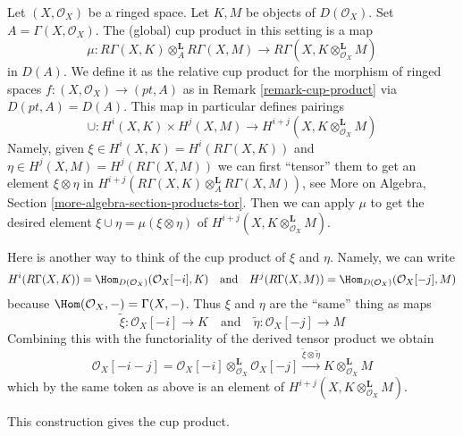 \noindent
Let $(X, \mathcal{O}_X)$ be a ringed space. Let $K, M$ be objects
of $D(\mathcal{O}_X)$. Set $A = \Gamma(X, \mathcal{O}_X)$.
The (global) cup product in this setting is a map
$$
\mu :
R\Gamma(X, K) \otimes_A^\mathbf{L} R\Gamma(X, M)
\longrightarrow
R\Gamma(X, K \otimes_{\mathcal{O}_X}^\mathbf{L} M)
$$
in $D(A)$. We define it as the relative cup product for the
morphism of ringed spaces $f : (X, \mathcal{O}_X) \to (pt, A)$
as in Remark \ref{remark-cup-product} via $D(pt, A) = D(A)$.
This map in particular defines pairings
$$
\cup :
H^i(X, K) \times H^j(X, M)
\longrightarrow
H^{i + j}(X, K \otimes_{\mathcal{O}_X}^\mathbf{L} M)
$$
Namely, given $\xi \in H^i(X, K) = H^i(R\Gamma(X, K))$ and
$\eta \in H^j(X, M) = H^j(R\Gamma(X, M))$ we can
first ``tensor'' them to get an element $\xi \otimes \eta$ in
$H^{i + j}(R\Gamma(X, K) \otimes_A^\mathbf{L} R\Gamma(X, M))$, see
More on Algebra, Section \ref{more-algebra-section-products-tor}.
Then we can apply $\mu$ to get the desired element
$\xi \cup \eta = \mu(\xi \otimes \eta)$
of $H^{i + j}(X, K \otimes_{\mathcal{O}_X}^\mathbf{L} M)$.

\medskip\noindent
Here is another way to think of the cup product of $\xi$ and $\eta$.
Namely, we can write
$$
H^i(R\Gamma(X, K)) = \Hom_{D(\mathcal{O}_X)}(\mathcal{O}_X[-i], K)
\quad\text{and}\quad
H^j(R\Gamma(X, M)) = \Hom_{D(\mathcal{O}_X)}(\mathcal{O}_X[-j], M)
$$
because $\Hom(\mathcal{O}_X, -) = \Gamma(X, -)$.
Thus $\xi$ and $\eta$ are the ``same'' thing as maps
$$
\tilde \xi : \mathcal{O}_X[-i] \to K
\quad\text{and}\quad
\tilde \eta : \mathcal{O}_X[-j] \to M
$$
Combining this with the functoriality of the derived tensor product
we obtain
$$
\mathcal{O}_X[-i - j] =
\mathcal{O}_X[-i] \otimes_{\mathcal{O}_X}^\mathbf{L} \mathcal{O}_X[-j]
\xrightarrow{\tilde \xi \otimes \tilde \eta}
K \otimes_{\mathcal{O}_X}^\mathbf{L} M
$$
which by the same token as above is an element of
$H^{i + j}(X, K \otimes_{\mathcal{O}_X}^\mathbf{L} M)$.

\begin{lemma}
\label{lemma-second-cup-equals-first}
This construction gives the cup product.
\end{lemma}

